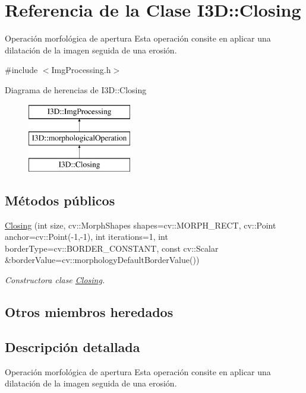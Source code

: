 \hypertarget{class_i3_d_1_1_closing}{}\section{Referencia de la Clase I3D\+:\+:Closing}
\label{class_i3_d_1_1_closing}


Operación morfológica de apertura Esta operación consite en aplicar una dilatación de la imagen seguida de una erosión.  




{\ttfamily \#include $<$Img\+Processing.\+h$>$}

Diagrama de herencias de I3D\+:\+:Closing\begin{figure}[H]
\begin{center}
\leavevmode
\includegraphics[height=3.000000cm]{class_i3_d_1_1_closing}
\end{center}
\end{figure}
\subsection*{Métodos públicos}
\begin{DoxyCompactItemize}
\item 
\hyperlink{class_i3_d_1_1_closing_a4e5f0f4666d8f1ff8a41abf7da1656f4}{Closing} (int size, cv\+::\+Morph\+Shapes shapes=cv\+::\+M\+O\+R\+P\+H\+\_\+\+R\+E\+CT, cv\+::\+Point anchor=cv\+::\+Point(-\/1,-\/1), int iterations=1, int border\+Type=cv\+::\+B\+O\+R\+D\+E\+R\+\_\+\+C\+O\+N\+S\+T\+A\+NT, const cv\+::\+Scalar \&border\+Value=cv\+::morphology\+Default\+Border\+Value())
\begin{DoxyCompactList}\small\item\em Constructora clase \hyperlink{class_i3_d_1_1_closing}{Closing}. \end{DoxyCompactList}\end{DoxyCompactItemize}
\subsection*{Otros miembros heredados}


\subsection{Descripción detallada}
Operación morfológica de apertura Esta operación consite en aplicar una dilatación de la imagen seguida de una erosión. 

